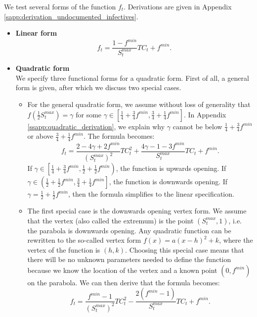 \documentclass[12pt]{article}
\begin{document}
	\newpage
	We test several forms of the function $f_t$. Derivations are given in Appendix \ref{sapp:derivation_undocumented_infectives}.
	\begin{itemize}
		\item \textbf{Linear form}
		    \begin{equation} \label{eq:linear_functional_form}
		        f_t = \frac{1-f^{min}}{S^{max}_t}TC_t + f^{min}.
		    \end{equation}
    		
    	\item \textbf{Quadratic form}\\
    	We specify three functional forms for a quadratic form. First of all, a general form is given, after which we discuss two special cases.
    	    \begin{itemize}
    	        \item For the general quadratic form, we assume without loss of generality that $f\left(\frac{1}{2}S^{max}_t\right) = \gamma$ for some $\gamma \in \left[\frac{1}{4} + \frac{3}{4}f^{min}, \frac{3}{4} + \frac{1}{4} f^{min}\right]$. In Appendix \ref{ssapp:quadratic_derivation}, we explain why $\gamma$ cannot be below $\frac{1}{4} + \frac{3}{4}f^{min}$ or above $\frac{3}{4} + \frac{1}{4} f^{min}$. The formula becomes:
    	            \begin{equation} \label{eq:quadratic_functional_form}
    	                f_t = \frac{2 - 4\gamma + 2f^{min}}{\left(S^{max}_t\right)^2}TC_t^2 + \frac{4\gamma - 1 - 3f^{min}}{S^{max}_t}TC_t + f^{min}.
    	            \end{equation}
		        If $\gamma \in \left[\frac{1}{4} + \frac{3}{4}f^{min}, \frac{1}{2} + \frac{1}{2}f^{min}\right)$, the function is upwards opening. If $\gamma \in \left(\frac{1}{2} + \frac{1}{2}f^{min}, \frac{3}{4} + \frac{1}{4} f^{min}\right]$, the function is downwards opening. If $\gamma = \frac{1}{2} + \frac{1}{2}f^{min}$, then the formula simplifies to the linear specification.
		        
		        \item The first special case is the downwards opening vertex form. We assume that the vertex (also called the extremum) is the point $(S^{max}_t, 1)$, i.e. the parabola is downwards opening. Any quadratic function can be rewritten to the so-called vertex form $f(x) = a(x - h)^2 + k$, where the vertex of the function is $(h, k)$. Choosing this special case means that there will be no unknown parameters needed to define the function because we know the location of the vertex and a known point $(0, f^{min})$ on the parabola. We can then derive that the formula becomes:
		            \begin{equation} \label{eq:quadratic_downwards_functional_form}
		                f_t = \frac{f^{min}-1}{\left(S^{max}_t\right)^2}TC_t^2 - \frac{2(f^{min}-1)}{S^{max}_t}TC_t + f^{min}.
		            \end{equation}
		        

\end{itemize}
\end{itemize}
\end{document}
